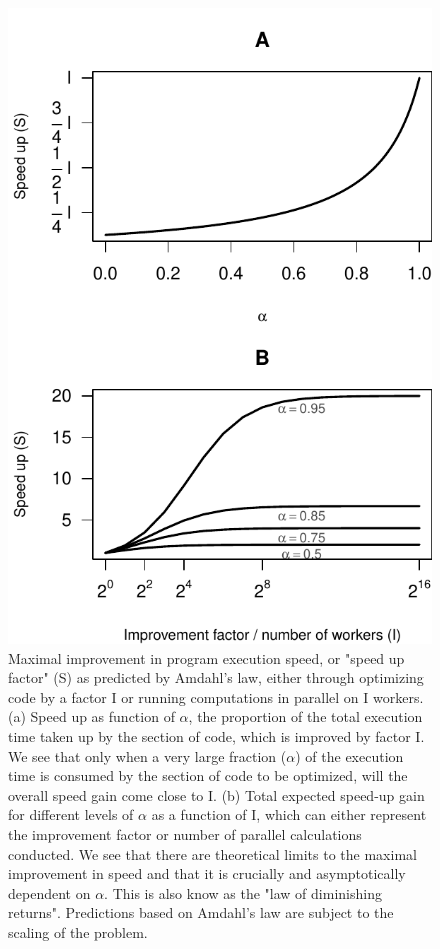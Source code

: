 \documentclass{article}\usepackage[]{graphicx}\usepackage[]{color}
\makeatletter
\def\maxwidth{ %
  \ifdim\Gin@nat@width>\linewidth
    \linewidth
  \else
    \Gin@nat@width
  \fi
}
\newenvironment{knitrout}{}{} %
\makeatother
\begin{document}
\begin{figure}[!ht]
\begin{center}
\begin{knitrout}
\color{fgcolor}
\includegraphics[width=\maxwidth]{figure/Amdahlslaw} 

\end{knitrout}
\caption{
Maximal improvement in program execution speed, or "speed up factor" (S) as predicted by Amdahl's law, either through optimizing code by a factor I or running computations in parallel on I workers. (a) Speed up as function of $\alpha$, the proportion of the total execution time taken up by the section of code, which is improved by factor I. We see that only when a very large fraction ($\alpha$) of the execution time is consumed by the section of code to be optimized, will the overall speed gain come close to I. (b) Total expected speed-up gain for different levels of $\alpha$ as a function of I, which can either represent the improvement factor or number of parallel calculations conducted. We see that there are theoretical limits to the maximal improvement in speed and that it is crucially and asymptotically dependent on $\alpha$. This is also know as the "law of diminishing returns". Predictions based on Amdahl's law are subject to the scaling of the problem. 
} \label{fig:amdahl}
\end{center}
\end{figure} 
 
\end{document}
